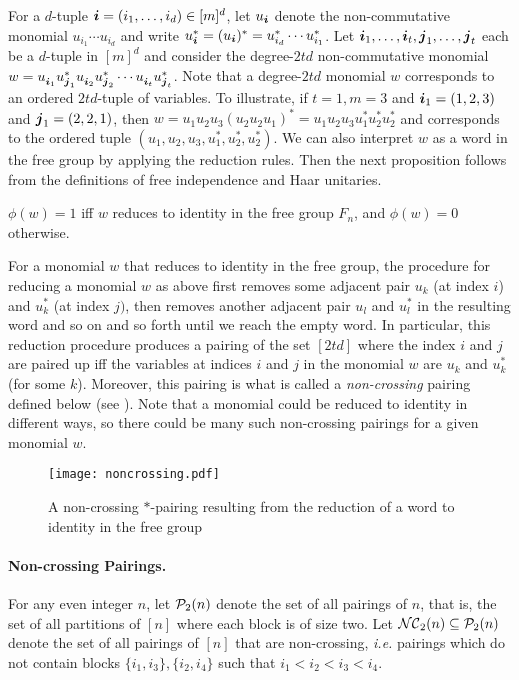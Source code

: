 For a $d$-tuple ${\boldsymbol{i}}  = (i_1, \ldots, i_d) \in [m]^d$, let $u_{{\boldsymbol{i}}}$ denote the non-commutative monomial $u_{i_1}\cdots u_{i_d}$ and write $u^*_{{\boldsymbol{i}}} = (u_{{\boldsymbol{i}}})^* = u^*_{i_d} \cdots u^*_{i_1}$. Let ${\boldsymbol{i}}_1,\ldots, {\boldsymbol{i}}_t, {\boldsymbol{j}}_1, \ldots, {\boldsymbol{j}}_t$ each be a $d$-tuple in $[m]^d$ and consider the degree-$2td$ non-commutative monomial $w = u^{}_{{\boldsymbol{i}}_1}u^*_{{\boldsymbol{j}}_1} u^{}_{{\boldsymbol{i}}_2}u^*_{{\boldsymbol{j}}_2}\cdots u^{}_{{\boldsymbol{i}}_t}u^*_{{\boldsymbol{j}}_t}$. Note that a degree-$2td$ monomial $w$ corresponds to an ordered $2td$-tuple of variables. To illustrate, if $t=1, m=3$ and ${\boldsymbol{i}}_1=(1,2,3)$ and ${\boldsymbol{j}}_1 = (2,2,1)$, then $w = u_{1}u_2u_3(u_2u_2u_1)^* = u_{1}u_2u_3u_1^*u^*_2u^*_2$ and corresponds to the ordered tuple $(u_1, u_2, u_3, u^*_1, u^*_2, u_2^*)$. We can also interpret $w$ as a word in the free group by applying the reduction rules. Then the next proposition follows from the definitions of free independence and Haar unitaries.

\begin{proposition} \label{prop:word}
    $\phi(w) = 1$ iff $w$ reduces to identity in the free group $F_n$, and $\phi(w) = 0$ otherwise.
\end{proposition}

 For a monomial $w$ that reduces to identity in the free group, the procedure for reducing a monomial $w$ as above first removes some adjacent pair $u_k$ (at index $i$) and $u^*_k$ (at index $j)$, then removes another adjacent pair $u_l$ and $u^*_l$ in the resulting word and so on and so forth until we reach the empty word. In particular, this reduction procedure produces a pairing of the set $[2td]$ where the index $i$ and $j$ are paired up iff the  variables at indices $i$ and $j$ in the monomial $w$ are $u_k$ and $u^*_k$ (for some $k$). Moreover, this pairing is what is called a \emph{non-crossing} pairing defined below (see ). Note that a monomial could be reduced to identity in different ways, so there could be many such non-crossing pairings for a given monomial $w$.



\begin{figure}[h!]
    \centering
   \texttt{[image: noncrossing.pdf]}
   \caption{\footnotesize A non-crossing $*$-pairing resulting from the reduction of a word to identity in the free group}
    \label{fig:non-crossing}
\end{figure}

\paragraph{Non-crossing Pairings.}  For any even integer $n$, let $\mathcal{P}_2(n)$ denote the set of all pairings of $n$, that is, the set of all partitions of $[n]$ where each block is of size two. Let $\mathcal{NC}_2(n) \subseteq \mathcal{P}_2(n)$ denote the set of all  pairings of $[n]$ that are non-crossing,\emph{ i.e.} pairings  which do not contain blocks $\{i_1,i_3\}, \{i_2, i_4\}$ such that $i_1 < i_2 < i_3 < i_4$. 

